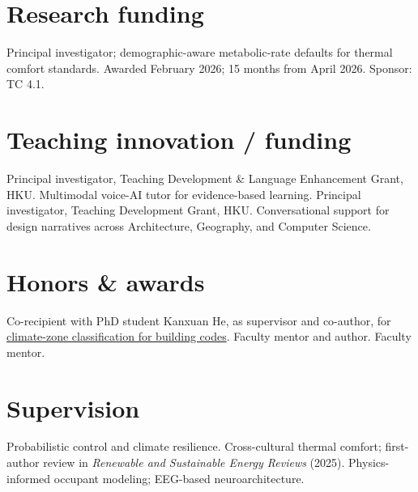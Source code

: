 \section{Research funding}
  {Principal investigator; demographic-aware metabolic-rate defaults for thermal comfort standards.
   Awarded February 2026; 15 months from April 2026. Sponsor: TC 4.1.}

\clearpage
\section{Teaching innovation / funding}
  {Principal investigator, Teaching Development \& Language Enhancement Grant, HKU.
   Multimodal voice-AI tutor for evidence-based learning.}
  {Principal investigator, Teaching Development Grant, HKU. Conversational support for design narratives across Architecture, Geography, and Computer Science.}

\section{Honors \& awards}
  {Co-recipient with PhD student Kanxuan He, as supervisor and co-author, for
   \href{https://doi.org/10.1051/e3sconf/202671610011}{climate-zone classification for building codes}.}
  {Faculty mentor and author.}
  {Faculty mentor.}

\section{Supervision}
  {Probabilistic control and climate resilience.}
  {Cross-cultural thermal comfort; first-author review in
   \emph{Renewable and Sustainable Energy Reviews} (2025).}
  {Physics-informed occupant modeling; EEG-based neuroarchitecture.}

